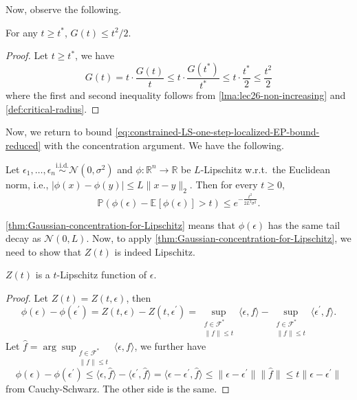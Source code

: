 Now, observe the following.

\begin{corollary}\label{col:lec26-non-increasing}
	For any \(t \geq t^{\ast} \), \(G(t) \leq t^2 / 2\).
\end{corollary}
\begin{proof}
	Let \(t \geq t^{\ast} \), we have
	\[
		G(t)
		= t \cdot \frac{G(t)}{t}
		\leq t \cdot \frac{G(t^{\ast} )}{t^{\ast} }
		\leq t \cdot \frac{t^{\ast} }{2}
		\leq \frac{t^2}{2}
	\]
	where the first and second inequality follows from \autoref{lma:lec26-non-increasing} and \autoref{def:critical-radius}.
\end{proof}

Now, we return to bound \autoref{eq:constrained-LS-one-step-localized-EP-bound-reduced} with the concentration argument. We have the following.

\begin{theorem}\label{thm:Gaussian-concentration-for-Lipschitz}
	Let \(\epsilon _1, \dots , \epsilon _n \overset{\text{i.i.d.} }{\sim } \mathcal{N} (0, \sigma ^2)\) and \(\phi \colon \mathbb{R} ^n \to \mathbb{R} \) be \(L\)-Lipschitz w.r.t.\ the Euclidean norm, i.e., \(\vert \phi (x) - \phi (y) \vert \leq L \lVert x - y \rVert _2\). Then for every \(t \geq 0\),
	\[
		\mathbb{P} \left( \phi (\epsilon ) - \mathbb{E}_{}\left[\phi (\epsilon ) \right] > t \right) \leq e^{-\frac{t^2}{2L^2 \sigma ^2}}.
	\]
\end{theorem}

\autoref{thm:Gaussian-concentration-for-Lipschitz} means that \(\phi (\epsilon )\) has the same tail decay as \(\mathcal{N} (0, L)\). Now, to apply \autoref{thm:Gaussian-concentration-for-Lipschitz}, we need to show that \(Z(t)\) is indeed Lipschitz.

\begin{lemma}\label{lma:lec26-Lipschitz}
	\(Z(t)\) is a \(t\)-Lipschitz function of \(\epsilon \).
\end{lemma}
\begin{proof}
	Let \(Z(t) = Z(t, \epsilon )\), then
	\[
		\phi (\epsilon ) - \phi (\epsilon ^{\prime} )
		= Z(t, \epsilon ) - Z(t, \epsilon ^{\prime} )
		= \sup _{\substack{f\in \mathscr{F} ^{\ast} \\ \lVert f \rVert \leq t}} \langle \epsilon , f \rangle - \sup _{\substack{f\in \mathscr{F} ^{\ast} \\ \lVert f \rVert \leq t}} \langle \epsilon ^{\prime} , f \rangle.
	\]
	Let \(\hat{f} = \arg \sup _{\substack{f\in \mathscr{F} ^{\ast} \\ \lVert f \rVert \leq t}} \langle \epsilon , f \rangle\), we further have
	\[
		\phi (\epsilon ) - \phi (\epsilon ^{\prime} )
		\leq \langle \epsilon , \hat{f} \rangle - \langle \epsilon ^{\prime} , \hat{f} \rangle
		= \langle \epsilon - \epsilon ^{\prime} , \hat{f}  \rangle
		\leq \lVert \epsilon - \epsilon ^{\prime} \rVert \lVert \hat{f} \rVert
		\leq t\lVert \epsilon - \epsilon ^{\prime} \rVert
	\]
	from Cauchy-Schwarz. The other side is the same.
\end{proof}

